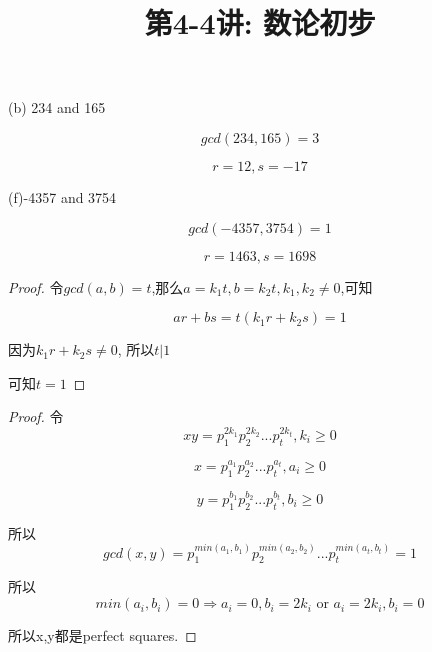 \documentclass[a4paper, justified]{tufte-handout}
\title{第4-4讲: 数论初步}
\date{\zhtoday} %
\begin{document}
\maketitle
\noplagiarism %
\begin{abstract}
\end{abstract}
\beginrequired

\begin{problem}[TJ 2-15(b,f)]
\end{problem}

\begin{solution}
  (b) 234 and 165

  $$gcd(234,165)=3$$

  $$r=12,s=-17$$

  (f)-4357 and 3754

  $$gcd(-4357,3754) = 1$$

  $$r=1463,s=1698$$
\end{solution}

\begin{problem}[TJ 2-16]
\end{problem}

\begin{proof}
  令$gcd(a,b)=t$,那么$a=k_1t,b=k_2t,k_1,k_2 \neq 0$,可知

  $$ar+bs=t(k_1r+k_2s)=1$$

  因为$k_1r+k_2s \neq 0$, 所以$t|1$

  可知$t=1$
\end{proof}

\begin{problem}[TJ 2-19]
\end{problem}

\begin{proof}
  令
  $$xy=p_1^{2k_1}p_2^{2k_2}...p_t^{2k_t},k_i \geq 0$$

  $$x=p_1^{a_1}p_2^{a_2}...p_t^{a_t},a_i \geq 0$$

  $$y=p_1^{b_1}p_2^{b_2}...p_t^{b_t},b_i \geq 0$$

  所以
  $$gcd(x,y)=p_1^{min(a_1,b_1)}p_2^{min(a_2,b_2)}...p_t^{min(a_t,b_t)}=1$$

  所以
  $$min(a_i,b_i)=0 \Rightarrow a_i=0,b_i=2k_i \text{ or } a_i =2k_i
    ,b_i =0$$

  所以x,y都是perfect squares.

\end{proof}
\end{document}
